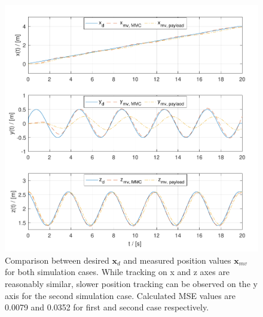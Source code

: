 \begin{figure}[h!]
	\centering
	\includegraphics[width=\columnwidth]{./pictures/both_pos.pdf}
	\caption{Comparison between desired $\textbf{x}_d$ and measured position values $\textbf{x}_{mv}$ for both simulation cases. While tracking on x and z axes are reasonably similar, slower position tracking can be observed on the y axis for the second simulation case. Calculated MSE values are 0.0079 and 0.0352 for first and second case respectively.}
	\label{fig:traj_pos}
\end{figure}

